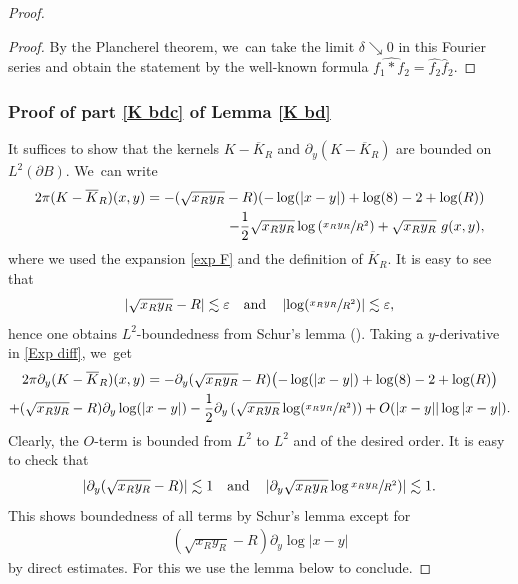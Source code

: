\documentclass[JEP,XML,SOM,Unicode,published]{cedram}
\let\epsilon\varepsilon
\theoremstyle{definition}
\newcommand\eq{=}
\let\de\partial
\let\eps\epsilon
\begin{document}
\begin{proof}
\begin{proof}
By the Plancherel theorem, we~can take the limit $\delta\searrow 0$ in this Fourier series and obtain the statement by the well-known formula $\widehat{f_1*f_2}=\widehat{f_2}\widehat{f}_2$.
\end{proof}

\subsubsection*{Proof of part \eqref{K bdc} of Lemma \ref{K bd}}
It suffices to show that the kernels $K-\overline{K}_R$ and $\de_y(K-\overline{K}_R)$ are bounded on $L^2(\de B)$. We~can write
\begin{equation}\begin{aligned}\label{Exp diff}
2\pi(K-\overline{K}_R)(x,y)\eq -(\sqrt{x_Ry_R}-R)(-\log(|x-y|)+\log(8)-2+\log(R)) \\
-\frac{1}{2}\sqrt{x_Ry_R}\log\left(\sfrac{x_Ry_R}{R^2}\right)+\sqrt{x_Ry_R}\,\,g(x,y),
\end{aligned}\end{equation}
where we used the expansion \eqref{exp F} and the definition of $\overline{K}_R$. It is easy to see that
\begin{align*}
\left|\sqrt{x_Ry_R}-R\right|\lesssim \eps\quad\text{and}\quad \left|\log(\sfrac{x_Ry_R}{R^2})\right|\lesssim \eps,
\end{align*}
hence one obtains $L^2$-boundedness from Schur's lemma (\cf \cite[App.\,A.1]{Grafakos}).
Taking a $y$-derivative in \eqref{Exp diff}, we~get
\begin{multline*}
2\pi\de_y (K-\overline{K}_R)(x,y)\eq-\de_y (\sqrt{x_Ry_R}-R) \bigl(-\log(|x-y|)+\log(8)-2+\log(R)\bigr)\\
+(\sqrt{x_Ry_R}-R)\de_y\log(|x-y|)-\frac{1}{2}\de_y\left(\sqrt{x_Ry_R}\log(\sfrac{x_Ry_R}{R^2})\right)+O(|x-y||\log|x-y|).
\end{multline*}
Clearly, the $O$-term is bounded from $L^2$ to $L^2$ and of the desired order. It is easy to check that
\begin{align*}
\left|\de_y (\sqrt{x_Ry_R}-R)\right|\lesssim 1\quad\text{and}\quad\left|\de_y\sqrt{x_Ry_R}\log\sfrac{x_Ry_R}{R^2})\right|\lesssim 1.
\end{align*}
This shows boundedness of all terms by Schur's lemma except for
\begin{align*}(\sqrt{x_Ry_R}-R)\de_y\log|x-y|
\end{align*}
by direct estimates. For this we use the lemma below to conclude.
\end{proof}
\end{document}
